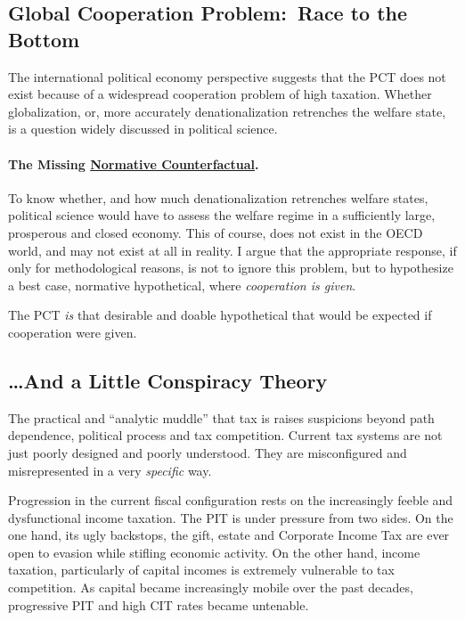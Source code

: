 \subsection[Global Cooperation Problem]{Global Cooperation Problem:\ Race to the Bottom} The international political economy perspective suggests that the PCT does not exist because of a widespread cooperation problem of high taxation.
Whether globalization, or, more accurately denationalization retrenches the welfare state, is a question widely discussed in political science.


\paragraph{The Missing \href{http://maxheld.de/2009/10/13/setting-goalposts/}{Normative Counterfactual}.}
To know whether, and how much denationalization retrenches welfare states, political science would have to assess the welfare regime in a sufficiently large, prosperous and closed economy.
This of course, does not exist in the OECD world, and may not exist at all in reality.
I argue that the appropriate response, if only for methodological reasons, is not to ignore this problem, but to hypothesize a best case, normative hypothetical, where \emph{cooperation is given}.

The PCT \emph{is} that desirable and doable hypothetical that would be expected if cooperation were given.

\subsection[Conspiracy Theory]{\ldots And a Little Conspiracy Theory} \label{sec:Conspiracy} The practical and ``analytic muddle'' that tax is \citep[862]{McCaffery2005} raises suspicions beyond path dependence, political process and tax competition.
Current tax systems are not just poorly designed and poorly understood.
They are misconfigured and misrepresented in a very \emph{specific} way.

Progression in the current fiscal configuration rests on the increasingly feeble and dysfunctional income taxation.
The PIT is under pressure from two sides.
On the one hand, its ugly backstops, the gift, estate and Corporate Income Tax are ever open to evasion while stifling economic activity.
On the other hand, income taxation, particularly of capital incomes is extremely vulnerable to tax competition.
As capital became increasingly mobile over the past decades, progressive PIT and high CIT rates became untenable.

